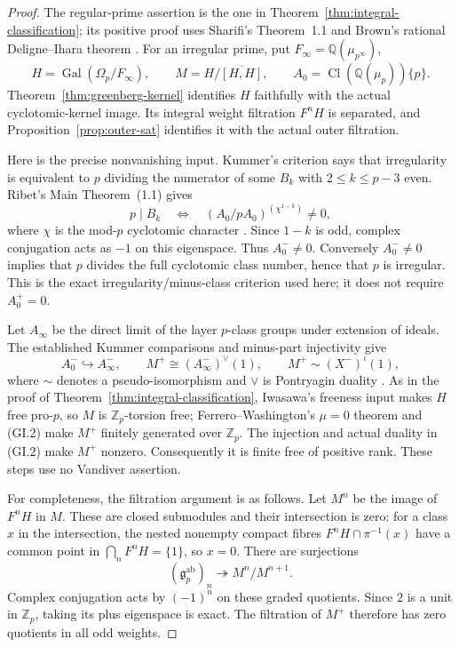 \begin{proof}
The regular-prime assertion is the one in
Theorem~\ref{thm:integral-classification}; its positive proof uses
Sharifi's Theorem~1.1 and Brown's rational Deligne--Ihara theorem
\cite[Theorem~1.1]{Sharifi2002}\cite[\S\S2.1--2.3]{Brown2019}.
For an irregular prime, put $F_\infty=\mathbb Q(\mu_{p^\infty})$,
\[
 H=\operatorname{Gal}(\Omega_p/F_\infty),\qquad
 M=H/\overline{[H,H]},\qquad
 A_0=\operatorname{Cl}(\mathbb Q(\mu_p))\{p\}.
\]
Theorem~\ref{thm:greenberg-kernel} identifies $H$ faithfully with
the actual cyclotomic-kernel image.  Its integral weight filtration
$F^nH$ is separated, and Proposition~\ref{prop:outer-sat}
identifies it with the actual outer filtration.

Here is the precise nonvanishing input.  Kummer's criterion says that
irregularity is equivalent to $p$ dividing the numerator of some
$B_k$ with $2\le k\le p-3$ even.  Ribet's Main Theorem~(1.1) gives
\[
 p\mid B_k
 \quad\Longleftrightarrow\quad
 (A_0/pA_0)^{(\chi^{1-k})}\ne0,
 \tag{GI.1}
\]
where $\chi$ is the mod-$p$ cyclotomic character
\cite[\S1, p.~151, Main Theorem~(1.1)]{Ribet1976}.
Since $1-k$ is odd, complex conjugation acts as $-1$ on this
eigenspace.  Thus $A_0^-\ne0$.  Conversely $A_0^-\ne0$ implies
that $p$ divides the full cyclotomic class number, hence that $p$
is irregular.  This is the exact irregularity/minus-class criterion
used here; it does not require $A_0^+=0$.

Let $A_\infty$ be the direct limit of the layer $p$-class groups
under extension of ideals.  The established Kummer comparisons and
minus-part injectivity give
\[
 A_0^-\hookrightarrow A_\infty^-,\qquad
 M^+\cong(A_\infty^-)^\vee(1),\qquad
 M^+\sim(X^-)^\iota(1),
 \tag{GI.2}
\]
where $\sim$ denotes a pseudo-isomorphism and $\vee$ is
Pontryagin duality
\cite[Propositions~3.4.1 and~3.4.7, Corollary~3.4.8]{SharifiIwasawaNotes}.
As in the proof of Theorem~\ref{thm:integral-classification},
Iwasawa's freeness input makes $H$ free pro-$p$, so $M$ is
$\mathbb Z_p$-torsion free; Ferrero--Washington's $\mu=0$
theorem and (GI.2) make $M^+$ finitely generated over $\mathbb Z_p$.
The injection and actual duality in (GI.2) make $M^+$ nonzero.
Consequently it is finite free of positive rank.  These steps use
no Vandiver assertion.

For completeness, the filtration argument is as follows.  Let
$M^n$ be the image of $F^nH$ in $M$.  These are closed submodules
and their intersection is zero: for a class $x$ in the intersection,
the nested nonempty compact fibres
$F^nH\cap\pi^{-1}(x)$ have a common point in
$\bigcap_nF^nH=\{1\}$, so $x=0$.
There are surjections
\[
 (\mathfrak g_p^{\mathrm{ab}})_n
 \twoheadrightarrow M^n/M^{n+1}.
 \tag{GI.3}
\]
Complex conjugation acts by $(-1)^n$ on these graded quotients.
Since $2$ is a unit in $\mathbb Z_p$, taking its plus eigenspace
is exact.  The filtration of $M^+$ therefore has zero quotients
in all odd weights.


\end{proof}
